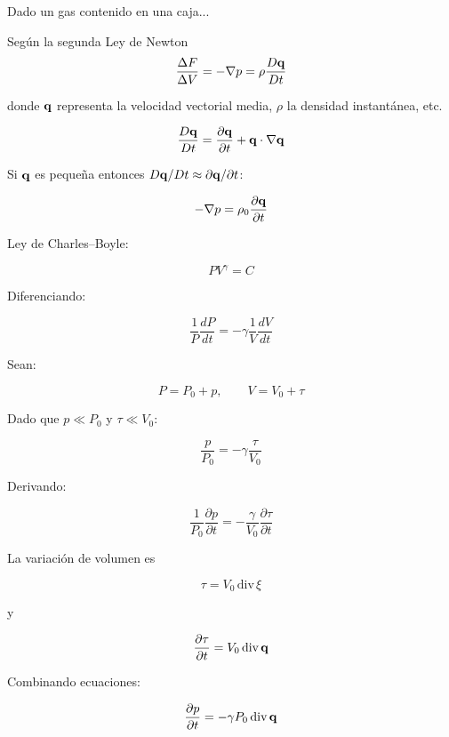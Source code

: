 \documentclass[11pt]{beamer}
\begin{document}
	\begin{frame}
		Dado un gas contenido en una caja...
	\end{frame}
	
	\begin{frame}
		Según la segunda Ley de Newton 
		\begin{equation}\label{eq1}
			\frac{\Delta F}{\Delta V}=-\nabla p=\rho\frac{D{\bf q}}{Dt}
		\end{equation}
		
		donde ${\bf q}$ representa la velocidad vectorial media, $\rho$ la densidad 
		instantánea, etc.
		
		\[
		\frac{D{\bf q}}{Dt}=\frac{\partial{\bf q}}{\partial t}+{\bf q}\cdot\nabla{\bf q}
		\]
	\end{frame}
	
	\begin{frame}
		Si ${\bf q}$ es pequeña entonces $D{\bf q}/Dt \approx \partial{\bf q}/\partial t$:
		
		\begin{equation}
			-\nabla p=\rho_0\frac{\partial{\bf q}}{\partial t}
		\end{equation}
		
		Ley de Charles–Boyle:
		
		\[
		PV^\gamma = C
		\]
	\end{frame}
	
	\begin{frame}
		Diferenciando:
		
		\[
		\frac{1}{P}\frac{dP}{dt} = -\gamma \frac{1}{V}\frac{dV}{dt}
		\]
		
		Sean:
		
		\[
		P=P_0+p,\qquad V=V_0+\tau
		\]
	\end{frame}
	
	\begin{frame}
		Dado que $p\ll P_0$ y $\tau \ll V_0$:
		
		\[
		\frac{p}{P_0} = -\gamma \frac{\tau}{V_0}
		\]
		
		Derivando:
		
		\[
		\frac{1}{P_0}\frac{\partial p}{\partial t}
		= -\frac{\gamma}{V_0}\frac{\partial\tau}{\partial t}
		\]
	\end{frame}
	
	\begin{frame}
		La variación de volumen es
		
		\[
		\tau = V_0 \, \text{div}\,\xi
		\]
		
		y
		
		\[
		\frac{\partial \tau}{\partial t} = V_0\,\text{div}\,{\bf q}
		\]
		
		Combinando ecuaciones:
		
		\[
		\frac{\partial p}{\partial t} = -\gamma P_0 \, \text{div}\,{\bf q}
		\]
	\end{frame}
	
\end{document}
